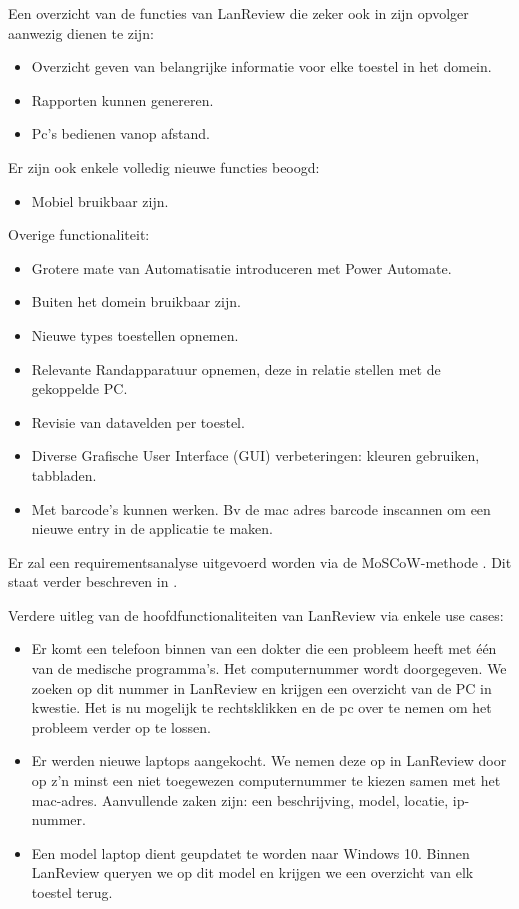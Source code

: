 Een overzicht van de functies van LanReview die zeker ook in zijn opvolger aanwezig dienen te zijn:
\begin{itemize}
    \item  Overzicht geven van belangrijke informatie voor elke toestel in het domein.
    \item Rapporten kunnen genereren.
\item Pc’s bedienen vanop afstand.
\end{itemize}
Er zijn ook enkele volledig nieuwe functies beoogd:
\begin{itemize}
\item Mobiel bruikbaar zijn.
\end{itemize}
Overige functionaliteit:
\begin{itemize}
    \item Grotere mate van Automatisatie introduceren met Power Automate.
    \item Buiten het domein bruikbaar zijn.
    \item Nieuwe types toestellen opnemen.
    \item Relevante Randapparatuur opnemen, deze in relatie stellen met de gekoppelde PC.
    \item Revisie van datavelden per toestel.
    \item Diverse Grafische User Interface (GUI) verbeteringen: kleuren gebruiken, tabbladen.
    \item Met barcode's kunnen werken. Bv de mac adres barcode inscannen om een nieuwe entry in de applicatie te maken.
\end{itemize}
Er zal een requirementsanalyse uitgevoerd worden via de MoSCoW-methode \parencite{Wikipedia2020}. Dit staat verder beschreven in .

\vspace{5mm}

Verdere uitleg van de hoofdfunctionaliteiten van LanReview via enkele use cases:
\begin{itemize}
    \item Er komt een telefoon binnen van een dokter die een probleem heeft met één van de medische programma's. Het computernummer wordt doorgegeven. We zoeken op dit nummer in LanReview en krijgen een overzicht van de PC in kwestie. Het is nu mogelijk te rechtsklikken en de pc over te nemen om het probleem verder op te lossen.
    \item Er werden nieuwe laptops aangekocht. We nemen deze op in LanReview door op z'n minst een niet toegewezen computernummer te kiezen samen met het mac-adres. Aanvullende zaken zijn: een beschrijving, model, locatie, ip-nummer.
    \item Een model laptop dient geupdatet te worden naar Windows 10. Binnen LanReview queryen we op dit model en krijgen we een overzicht van elk toestel terug.
\end{itemize}

